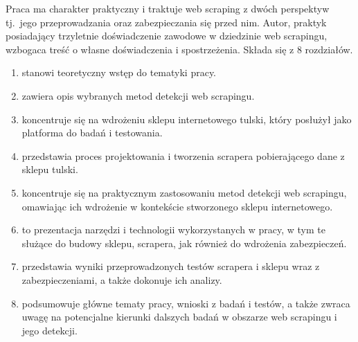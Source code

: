 Praca ma charakter praktyczny i traktuje web scraping z dwóch perspektyw tj.~jego przeprowadzania oraz zabezpieczania się przed nim.
Autor, praktyk posiadający trzyletnie doświadczenie zawodowe w dziedzinie web scrapingu, wzbogaca treść o własne doświadczenia i spostrzeżenia.
Składa się z 8 rozdziałów.
\begin{enumerate}[label={Rozdział \arabic*},labelindent=\parindent, leftmargin=*]
    \item {} stanowi teoretyczny wstęp do tematyki pracy.
    \item {} zawiera opis wybranych metod detekcji web scrapingu.
    \item {} koncentruje się na wdrożeniu sklepu internetowego tulski, który posłużył jako platforma do badań i testowania.
    \item {} przedstawia proces projektowania i tworzenia scrapera pobierającego dane z sklepu tulski.
    \item {} koncentruje się na praktycznym zastosowaniu metod detekcji web scrapingu, omawiając ich wdrożenie w kontekście stworzonego sklepu internetowego.
    \item {} to prezentacja narzędzi i technologii wykorzystanych w pracy, w tym te służące do budowy sklepu, scrapera, jak również do wdrożenia zabezpieczeń.
    \item {} przedstawia wyniki przeprowadzonych testów scrapera i sklepu wraz z zabezpieczeniami, a także dokonuje ich analizy.
    \item {} podsumowuje główne tematy pracy, wnioski z badań i testów, a także zwraca uwagę na potencjalne kierunki dalszych badań w obszarze web scrapingu i jego detekcji.
\end{enumerate}
